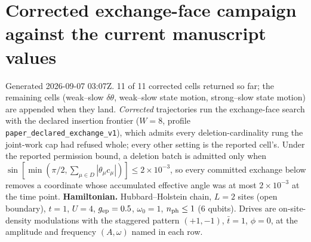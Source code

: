 \documentclass[10pt]{article}
\begin{document}
\section*{Corrected exchange-face campaign against the current manuscript values}
Generated 2026-09-07 03:07Z.  11 of 11 corrected cells returned so far; the remaining cells (weak--slow $\delta\theta$, weak--slow state motion, strong--slow state motion) are appended when they land.  \emph{Corrected} trajectories run the exchange-face search with the declared insertion frontier ($W=8$, profile \texttt{paper\_declared\_exchange\_v1}), which admits every deletion-cardinality rung the joint-work cap had refused whole; every other setting is the reported cell's.  Under the reported permission bound, a deletion batch is admitted only when $\sin[\min(\pi/2,\sum_{\mu\in D}|\theta_\mu c_\mu|)]\le2\times10^{-3}$, so every committed exchange below removes a coordinate whose accumulated effective angle was at most $2\times10^{-3}$ at the time point.
\textbf{Hamiltonian.} Hubbard--Holstein chain, $L=2$ sites (open boundary), $t=1$, $U=4$, $g_{\rm ep}=0.5$, $\omega_0=1$, $n_{\rm ph}\le1$ (6 qubits).  Drives are on-site-density modulations with the staggered pattern $(+1,-1)$, $\bar t=1$, $\phi=0$, at the amplitude and frequency $(A,\omega)$ named in each row.
\end{document}
